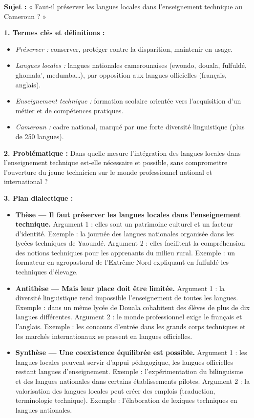 \documentclass[11pt]{article}
\begin{document}
\begin{corrige}
\textbf{Sujet :} « Faut-il préserver les langues locales dans l'enseignement technique au Cameroun ? »

\textbf{1. Termes clés et définitions :}
\begin{itemize}
\item \emph{Préserver :} conserver, protéger contre la disparition, maintenir en usage.
\item \emph{Langues locales :} langues nationales camerounaises (ewondo, douala, fulfuldé, ghomala', medumba\ldots), par opposition aux langues officielles (français, anglais).
\item \emph{Enseignement technique :} formation scolaire orientée vers l'acquisition d'un métier et de compétences pratiques.
\item \emph{Cameroun :} cadre national, marqué par une forte diversité linguistique (plus de 250 langues).
\end{itemize}

\textbf{2. Problématique :} Dans quelle mesure l'intégration des langues locales dans l'enseignement technique est-elle nécessaire et possible, sans compromettre l'ouverture du jeune technicien sur le monde professionnel national et international ?

\textbf{3. Plan dialectique :}
\begin{itemize}
\item \textbf{Thèse — Il faut préserver les langues locales dans l'enseignement technique.}
Argument 1 : elles sont un patrimoine culturel et un facteur d'identité. Exemple : la journée des langues nationales organisée dans les lycées techniques de Yaoundé.
Argument 2 : elles facilitent la compréhension des notions techniques pour les apprenants du milieu rural. Exemple : un formateur en agropastoral de l'Extrême-Nord expliquant en fulfuldé les techniques d'élevage.
\item \textbf{Antithèse — Mais leur place doit être limitée.}
Argument 1 : la diversité linguistique rend impossible l'enseignement de toutes les langues. Exemple : dans un même lycée de Douala cohabitent des élèves de plus de dix langues différentes.
Argument 2 : le monde professionnel exige le français et l'anglais. Exemple : les concours d'entrée dans les grands corps techniques et les marchés internationaux se passent en langues officielles.
\item \textbf{Synthèse — Une coexistence équilibrée est possible.}
Argument 1 : les langues locales peuvent servir d'appui pédagogique, les langues officielles restant langues d'enseignement. Exemple : l'expérimentation du bilinguisme et des langues nationales dans certains établissements pilotes.
Argument 2 : la valorisation des langues locales peut créer des emplois (traduction, terminologie technique). Exemple : l'élaboration de lexiques techniques en langues nationales.
\end{itemize}


\end{corrige}
\end{document}
